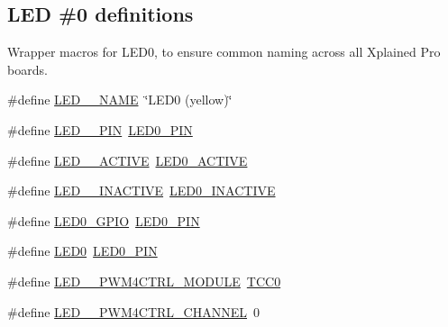 \subsection*{L\+ED \#0 definitions}
\label{_amgrp08ca6a846f7c08111059f2a22cc48e51}%
Wrapper macros for L\+E\+D0, to ensure common naming across all Xplained Pro boards. \begin{DoxyCompactItemize}
\item 
\#define \mbox{\hyperlink{group__samd21__xplained__pro__features__group_ga2687b6cee21a30f8cf66f81c1c2431e4}{L\+E\+D\+\_\+\_\+\+N\+A\+ME}}~\char`\"{}L\+E\+D0 (yellow)\char`\"{}
\item 
\#define \mbox{\hyperlink{group__samd21__xplained__pro__features__group_gad39bcbd30efbf4b9696783368266b2bb}{L\+E\+D\+\_\+\_\+\+P\+IN}}~\mbox{\hyperlink{group__samd21__xplained__pro__features__group_ga3fc522fda449d6edde717d6a857429cf}{L\+E\+D0\+\_\+\+P\+IN}}
\item 
\#define \mbox{\hyperlink{group__samd21__xplained__pro__features__group_ga88e5571eae6020697efb61d64d41fe3a}{L\+E\+D\+\_\+\_\+\+A\+C\+T\+I\+VE}}~\mbox{\hyperlink{group__samd21__xplained__pro__features__group_ga59e133b8ded0d632eeaeb2cbfec48886}{L\+E\+D0\+\_\+\+A\+C\+T\+I\+VE}}
\item 
\#define \mbox{\hyperlink{group__samd21__xplained__pro__features__group_ga5e8d4c71949d6451097cb08d095e703a}{L\+E\+D\+\_\+\_\+\+I\+N\+A\+C\+T\+I\+VE}}~\mbox{\hyperlink{group__samd21__xplained__pro__features__group_gaed3274cfe7ed308899e8416219bb08d2}{L\+E\+D0\+\_\+\+I\+N\+A\+C\+T\+I\+VE}}
\item 
\#define \mbox{\hyperlink{group__samd21__xplained__pro__features__group_gab6dc1ebd13b429afb03cfc49728cc896}{L\+E\+D0\+\_\+\+G\+P\+IO}}~\mbox{\hyperlink{group__samd21__xplained__pro__features__group_ga3fc522fda449d6edde717d6a857429cf}{L\+E\+D0\+\_\+\+P\+IN}}
\item 
\#define \mbox{\hyperlink{group__samd21__xplained__pro__features__group_gae8d5b4e7e2d9d21caaa4744d385d7cc7}{L\+E\+D0}}~\mbox{\hyperlink{group__samd21__xplained__pro__features__group_ga3fc522fda449d6edde717d6a857429cf}{L\+E\+D0\+\_\+\+P\+IN}}
\item 
\#define \mbox{\hyperlink{group__samd21__xplained__pro__features__group_ga2570f6c0e15c15039653fd46f951ae84}{L\+E\+D\+\_\+\_\+\+P\+W\+M4\+C\+T\+R\+L\+\_\+\+M\+O\+D\+U\+LE}}~\mbox{\hyperlink{group___s_a_m_d21_j18_a__base_ga99138b66570ac6a4b370ce5c3b52cd9f}{T\+C\+C0}}
\item 
\#define \mbox{\hyperlink{group__samd21__xplained__pro__features__group_gabac868436fcfacb2ceec0da9dd92813f}{L\+E\+D\+\_\+\_\+\+P\+W\+M4\+C\+T\+R\+L\+\_\+\+C\+H\+A\+N\+N\+EL}}~0

\end{DoxyCompactItemize}
